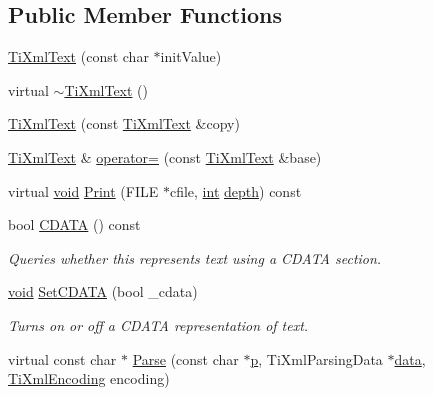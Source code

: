 \subsection*{Public Member Functions}
\begin{DoxyCompactItemize}
\item 
\hyperlink{class_ti_xml_text_af659e77c6b87d684827f35a8f4895960}{Ti\-Xml\-Text} (const char $\ast$init\-Value)
\item 
virtual \hyperlink{class_ti_xml_text_a829a4bd2d8d2461c333eb4f3f5b1b3d2}{$\sim$\-Ti\-Xml\-Text} ()
\item 
\hyperlink{class_ti_xml_text_a8d2cc1b4af2208cbb0171cf20f6815d1}{Ti\-Xml\-Text} (const \hyperlink{class_ti_xml_text}{Ti\-Xml\-Text} \&copy)
\item 
\hyperlink{class_ti_xml_text}{Ti\-Xml\-Text} \& \hyperlink{class_ti_xml_text_aed5b13f9c1b804c616fd533882c29f57}{operator=} (const \hyperlink{class_ti_xml_text}{Ti\-Xml\-Text} \&base)
\item 
virtual \hyperlink{wglew_8h_aeea6e3dfae3acf232096f57d2d57f084}{void} \hyperlink{class_ti_xml_text_a0cafbf6f236c7f02d12b2bffc2b7976b}{Print} (F\-I\-L\-E $\ast$cfile, \hyperlink{wglew_8h_a500a82aecba06f4550f6849b8099ca21}{int} \hyperlink{glew_8h_a1c814629538debe12a7bfe2509a3671e}{depth}) const 
\item 
bool \hyperlink{class_ti_xml_text_ad1a6a6b83fa2271022dd97c072a2b586}{C\-D\-A\-T\-A} () const 
\begin{DoxyCompactList}\small\item\em Queries whether this represents text using a C\-D\-A\-T\-A section. \end{DoxyCompactList}\item 
\hyperlink{wglew_8h_aeea6e3dfae3acf232096f57d2d57f084}{void} \hyperlink{class_ti_xml_text_acb17ff7c5d09b2c839393445a3de5ea9}{Set\-C\-D\-A\-T\-A} (bool \-\_\-cdata)
\begin{DoxyCompactList}\small\item\em Turns on or off a C\-D\-A\-T\-A representation of text. \end{DoxyCompactList}\item 
virtual const char $\ast$ \hyperlink{class_ti_xml_text_abb3e10deb3391772b902247e8d75331f}{Parse} (const char $\ast$\hyperlink{glew_8h_aa5367c14d90f462230c2611b81b41d23}{p}, Ti\-Xml\-Parsing\-Data $\ast$\hyperlink{fmod__codec_8h_a42c2b1d86fa71a425e73a882cb0a72c8}{data}, \hyperlink{tinyxml_8h_a88d51847a13ee0f4b4d320d03d2c4d96}{Ti\-Xml\-Encoding} encoding)
\item 

\end{DoxyCompactItemize}
